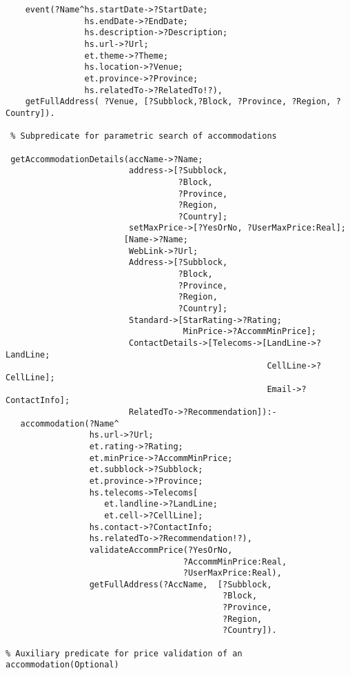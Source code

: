 \begin{verbatim}
    event(?Name^hs.startDate->?StartDate;  
                hs.endDate->?EndDate; 
                hs.description->?Description; 
                hs.url->?Url; 
                et.theme->?Theme;  
                hs.location->?Venue;  
                et.province->?Province;  
                hs.relatedTo->?RelatedTo!?),
    getFullAddress( ?Venue, [?Subblock,?Block, ?Province, ?Region, ?Country]).

 % Subpredicate for parametric search of accommodations 
   					
 getAccommodationDetails(accName->?Name; 
                         address->[?Subblock, 
                                   ?Block, 
                                   ?Province, 
                                   ?Region, 
                                   ?Country];
                         setMaxPrice->[?YesOrNo, ?UserMaxPrice:Real];
                        [Name->?Name; 
                         WebLink->?Url;
                         Address->[?Subblock, 
                                   ?Block, 
                                   ?Province, 
                                   ?Region, 
                                   ?Country];
                         Standard->[StarRating->?Rating; 
                                    MinPrice->?AccommMinPrice];
                         ContactDetails->[Telecoms->[LandLine->?LandLine; 
                                                     CellLine->?CellLine]; 
                                                     Email->?ContactInfo];
                         RelatedTo->?Recommendation]):-
   accommodation(?Name^ 
                 hs.url->?Url;
                 et.rating->?Rating;
                 et.minPrice->?AccommMinPrice;
                 et.subblock->?Subblock;
                 et.province->?Province;
                 hs.telecoms->Telecoms[ 
                    et.landline->?LandLine;
                    et.cell->?CellLine];
                 hs.contact->?ContactInfo;
                 hs.relatedTo->?Recommendation!?),
                 validateAccommPrice(?YesOrNo, 
                                    ?AccommMinPrice:Real, 
                                    ?UserMaxPrice:Real),
                 getFullAddress(?AccName,  [?Subblock, 
                                            ?Block,
                                            ?Province, 
                                            ?Region, 
                                            ?Country]).
		 
% Auxiliary predicate for price validation of an accommodation(Optional)
  

\end{verbatim}
